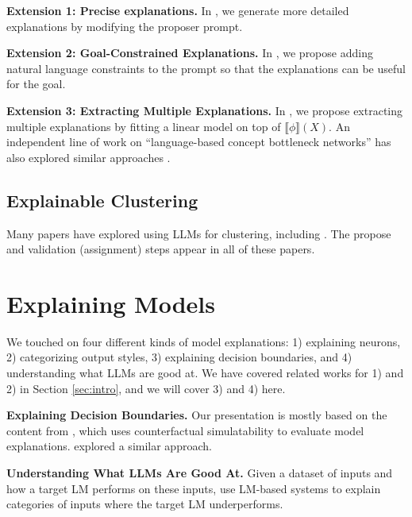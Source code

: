 \documentclass[12pt]{article}
\begin{document}
\noindent \textbf{Extension 1: Precise explanations.} In \citet{wang-etal-2023-goal, zhong2024explaining}, we generate more detailed explanations by modifying the proposer prompt. 

\noindent \textbf{Extension 2: Goal-Constrained Explanations.} 
In \citet{zhong2023goal, wang-etal-2023-goal}, we propose adding natural language constraints to the prompt so that the explanations can be useful for the goal.

\noindent \textbf{Extension 3: Extracting Multiple Explanations.}
In \citet{zhong2024explaining}, we propose extracting multiple explanations by fitting a linear model on top of $\llbracket \phi \rrbracket(X)$.
An independent line of work on ``language-based concept bottleneck networks'' has also explored similar approaches \citep{yang2023language, ludan2023interpretable, chiquier2024evolving, schrodi2024concept}.

\subsection{Explainable Clustering}

Many papers have explored using LLMs for clustering, including \citet{wang-etal-2023-goal, pham2023topicgpt, lam2024concept, viswanathan2024large, zhong2024explaining}.
The propose and validation (assignment) steps appear in all of these papers.

\section{Explaining Models}

We touched on four different kinds of model explanations: 1) explaining neurons, 2) categorizing output styles, 3) explaining decision boundaries, and 4) understanding what LLMs are good at.
We have covered related works for 1) and 2) in Section \ref{sec:intro}, and we will cover 3) and 4) here.

\noindent \textbf{Explaining Decision Boundaries.}
Our presentation is mostly based on the content from \citet{pmlr-v235-chen24bl}, which uses counterfactual simulatability to evaluate model explanations. 
\citet{mills2023almanacs} explored a similar approach.

\noindent \textbf{Understanding What LLMs Are Good At.}
Given a dataset of inputs and how a target LM performs on these inputs, 
\citet{sobhani-etal-2025-language, zhong2024explaining, zeng2025evaltree} use LM-based systems to explain categories of inputs where the target LM underperforms.
\end{document}
